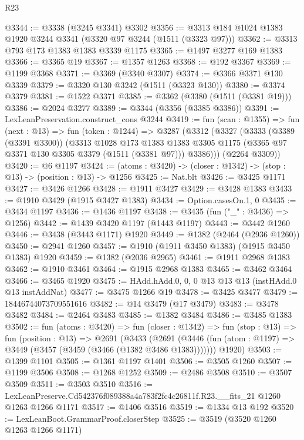 \begin{lexlean}{R23}
\begin{coremodule}
@3344 := @3338 (@3245 @3341) @3302
@3356 := @3313 @184 @1024 @1383 @1920 @3244 @3341 (@3320 @97 @3244 (@1511 (@3323 @97)))
@3362 := @3313 @793 @173 @1383 @1383 @3339 @1175
@3365 := @1497 @3277 @169 @1383
@3366 := @3365 @19
@3367 := @1357 @1263
@3368 := @192 @3367
@3369 := @1199 @3368
@3371 := @3369 (@3340 @3307)
@3374 := @3366 @3371 @130 @3339
@3379 := @3320 @130 @3242 (@1511 (@3323 @130))
@3380 := @3374 @3379
@3381 := @1522 @3371
@3385 := @3362 (@3380 (@1511 (@3381 @19)))
@3386 := @2024 @3277
@3389 := @3344 (@3356 (@3385 @3386))
@3391 := LexLeanPreservation.construct_cons @3244
@3419 := fun (scan : @1355) =>
  fun (next : @13) =>
  fun (token : @1244) =>
  @3287
    (@3312
      (@3327
        (@3333
          (@3389 (@3391 @3300))
          (@3313
            @1028
            @173
            @1383
            @1383
            @3305
            @1175
            (@3365 @97 @3371 @130 @3305 @3379 (@1511 (@3381 @97)))
            @3386)))
      (@2264 @3309))
@3420 := @6 @1197
@3424 := (atoms : @3420) -> (closer : @1342) -> (stop : @13) -> (position : @13) -> @1256
@3425 := Nat.blt
@3426 := @3425 @1171
@3427 := @3426 @1266
@3428 := @1911 @3427
@3429 := @3428 @1383
@3433 := @1910 @3429 (@1915 @3427 @1383)
@3434 := Option.casesOn.{1, 0}
@3435 := @3434 @1197
@3436 := @1436 @1197
@3438 := @3435 (fun ("_" : @3436) => @1256)
@3442 := @1439 @3420 @1197 (@1443 @1197)
@3443 := @3442 @1260
@3446 := @3438 (@3443 @1171) @1920
@3449 := @1382 (@2464 (@2936 @1260))
@3450 := @2941 @1260
@3457 := @1910 (@1911 @3450 @1383) (@1915 @3450 @1383) @1920
@3459 := @1382 (@2036 @2965)
@3461 := @1911 @2968 @1383
@3462 := @1910 @3461
@3464 := @1915 @2968 @1383
@3465 := @3462 @3464
@3466 := @3465 @1920
@3475 := HAdd.hAdd.{0, 0, 0} @13 @13 @13 (instHAdd.{0} @13 instAddNat)
@3477 := @3475 @1266 @19
@3478 := @3425 @3477
@3479 := 18446744073709551616
@3482 := @14 @3479 (@17 @3479)
@3483 := @3478 @3482
@3484 := @2464 @3483
@3485 := @1382 @3484
@3486 := @3485 @1383
@3502 := fun (atoms : @3420) =>
  fun (closer : @1342) =>
  fun (stop : @13) =>
  fun (position : @13) =>
  @2691
    (@3433
      (@2691 (@3446 (fun (atom : @1197) => @3449 (@3457 (@3459 (@3466 (@1382 @3486 @1383)))))))
      @1920)
@3503 := @1399 @1101
@3505 := @1361 @1197 @1401
@3506 := @3505 @1260
@3507 := @1199 @3506
@3508 := @1268 @1252
@3509 := @2486 @3508
@3510 := @3507 @3509
@3511 := @3503 @3510
@3516 := LexLeanPreserve.Cd542376f089388a4a783f2fc4c26811f.R23.__fits_21 @1260 @1263 @1266 @1171
@3517 := @1406 @3516
@3519 := @1334 @13 @192
@3520 := LexLeanBoot.GrammarProof.closerStep
@3525 := @3519 (@3520 @1260 @1263 @1266 @1171)

\end{coremodule}
\end{lexlean}
